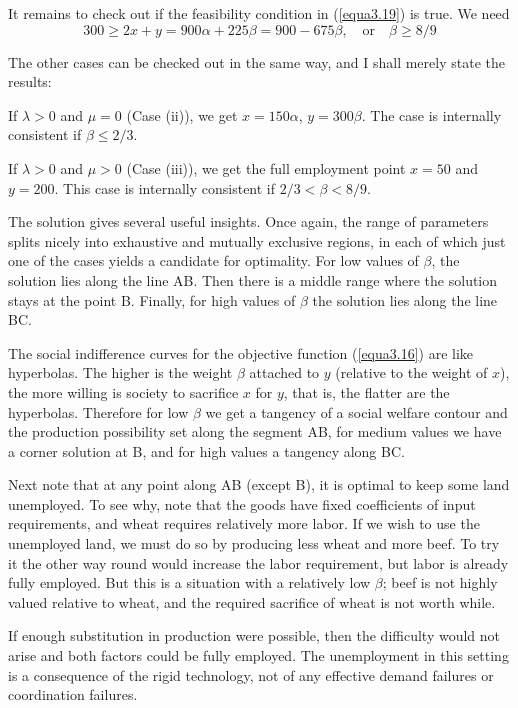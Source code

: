 It remains to check out if the feasibility condition in (\ref{equa3.19}) is true. We need
\begin{equation*}
300 \geq 2x+y=900\alpha + 225\beta = 900-675\beta, \quad \mbox{or} \quad \beta \geq 8/9
\end{equation*}

The other cases can be checked out in the same way, and I shall merely state the results:

If $\lambda>0$ and $\mu=0$ (Case (ii)), we get $x=150\alpha$, $y=300\beta$. The case is internally consistent if $\beta \leq 2/3$.

If $\lambda>0$ and $\mu>0$ (Case (iii)), we get the full employment point $x=50$ and $y=200$. This case is internally consistent if $2/3 < \beta < 8/9$.

The solution gives several useful insights. Once again, the range of parameters splits nicely into exhaustive and mutually exclusive regions, in each of which just one of the cases yields a candidate for optimality. For low values of $\beta$, the solution lies along the line AB. Then there is a middle range where the solution stays at the point B. Finally, for high values of $\beta$ the solution lies along the line BC.

The social indifference curves for the objective function (\ref{equa3.16}) are like hyperbolas. The higher is the weight $\beta$ attached to $y$ (relative to the weight of $x$), the more willing is society to sacrifice $x$ for $y$, that is, the flatter are the hyperbolas. Therefore for low $\beta$ we get a tangency of a social welfare contour and the production possibility set along the segment AB, for medium values we have a corner solution at B, and for high values a tangency along BC.

Next note that at any point along AB (except B), it is optimal to keep some land unemployed. To see why, note that the goods have fixed coefficients of input requirements, and wheat requires relatively more labor. If we wish to use the unemployed land, we must do so by producing less wheat and more beef. To try it the other way round would increase the labor requirement, but labor is already fully employed. But this is a situation with a relatively low $\beta$; beef is not highly valued relative to wheat, and the required sacrifice of wheat is not worth while.

If enough substitution in production were possible, then the difficulty would not arise and both factors could be fully employed. The unemployment in this setting is a consequence of the rigid technology, not of any effective demand failures or coordination failures.

